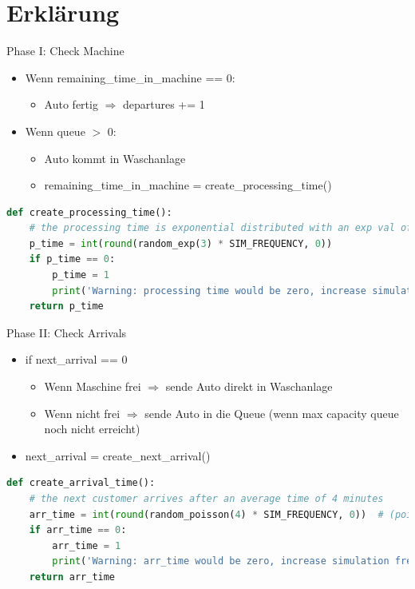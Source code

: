 \section{Erklärung}
\begin{frame}[fragile]{Phase I: Check Machine}
	\begin{itemize}
		\item Wenn remaining\_time\_in\_machine == 0:
		\begin{itemize}
			\item Auto fertig $\Rightarrow$ departures += 1
		\end{itemize}
		\item Wenn queue $>$ 0:
		\begin{itemize}
			\item Auto kommt in Waschanlage
			\item remaining\_time\_in\_machine = create\_processing\_time()
		\end{itemize}
	\end{itemize}
  \begin{lstlisting}[language=python]
def create_processing_time():
    # the processing time is exponential distributed with an exp val of 3 min.
    p_time = int(round(random_exp(3) * SIM_FREQUENCY, 0))
    if p_time == 0:
        p_time = 1
        print('Warning: processing time would be zero, increase simulation frequency!')
    return p_time
  \end{lstlisting}
\end{frame}

\begin{frame}[fragile]{Phase II: Check Arrivals}
	\begin{itemize}
		\item if next\_arrival == 0 
		\begin{itemize}
			\item Wenn Maschine frei $\Rightarrow$ sende Auto direkt in Waschanlage
			\item Wenn nicht frei $\Rightarrow$ sende Auto in die Queue (wenn max capacity queue noch nicht erreicht)
		\end{itemize}
		\item next\_arrival = create\_next\_arrival()
	\end{itemize}
  \begin{lstlisting}[language=python]
def create_arrival_time():
    # the next customer arrives after an average time of 4 minutes
    arr_time = int(round(random_poisson(4) * SIM_FREQUENCY, 0))  # (poisson distributed)
    if arr_time == 0:
        arr_time = 1
        print('Warning: arr_time would be zero, increase simulation frequency!')
    return arr_time
  \end{lstlisting}
\end{frame}



